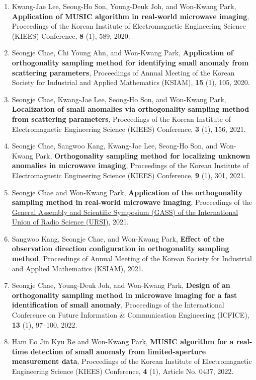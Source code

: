 \documentclass[10pt,A4]{article}
\begin{document}
\begin{enumerate}
\item\label{C-KIEES2020} Kwang-Jae Lee, Seong-Ho Son, Young-Deuk Joh, and Won-Kwang Park, \textbf{Application of MUSIC algorithm in real-world microwave imaging}, Proceedings of the Korean Institute of Electromagnetic Engineering Science (KIEES) Conference, \textbf{8} (1), 589, 2020.
\item\label{C-KSIAM2020} Seongje Chae, Chi Young Ahn, and Won-Kwang Park, \textbf{Application of orthogonality sampling method for identifying small anomaly from scattering parameters}, Proceedings of Annual Meeting of the Korean Society for Industrial and Applied Mathematics (KSIAM), \textbf{15} (1), 105, 2020.
\item\label{C-KIEES2021A} Seongje Chae, Kwang-Jae Lee, Seong-Ho Son, and Won-Kwang Park, \textbf{Localization of small anomalies via orthogonality sampling method from scattering parameters}, Proceedings of the Korean Institute of Electromagnetic Engineering Science (KIEES) Conference, \textbf{3} (1), 156, 2021.
\item\label{C-KIEES2021B} Seongje Chae, Sangwoo Kang, Kwang-Jae Lee, Seong-Ho Son, and Won-Kwang Park, \textbf{Orthogonality sampling method for localizing unknown anomalies in microwave imaging}, Proceedings of the Korean Institute of Electromagnetic Engineering Science (KIEES) Conference, \textbf{9} (1), 301, 2021.
\item\label{C-URSI2021} Seongje Chae and Won-Kwang Park, \textbf{Application of the orthogonality sampling method in real-world microwave imaging}, Proceedings of the \href{https://www.ursi2021.org}{ General Assembly and Scientific Symposium (GASS) of the International Union of Radio Science (URSI)}, 2021.
\item\label{C-KSIAM2021} Sangwoo Kang, Seongje Chae, and Won-Kwang Park, \textbf{Effect of the observation direction configuration in orthogonality sampling method}, Proceedings of Annual Meeting of the Korean Society for Industrial and Applied Mathematics (KSIAM), 2021.
\item\label{C-ICFICE2022} Seongje Chae, Young-Deuk Joh, and Won-Kwang Park, \textbf{Design of an orthogonality sampling method in microwave imaging for a fast identification of small anomaly}, Proceedings of the  International Conference on Future Information \& Communication Engineering (ICFICE), \textbf{13} (1), 97--100, 2022.
\item\label{C-KIEES2022A} Ham Eo Jin Kyu Re and Won-Kwang Park, \textbf{MUSIC algorithm for a real-time detection of small anomaly from limited-aperture measurement data}, Proceedings of the Korean Institute of Electromagnetic Engineering Science (KIEES) Conference, \textbf{4} (1), Article No. 0437, 2022.

\end{enumerate}
\end{document}

